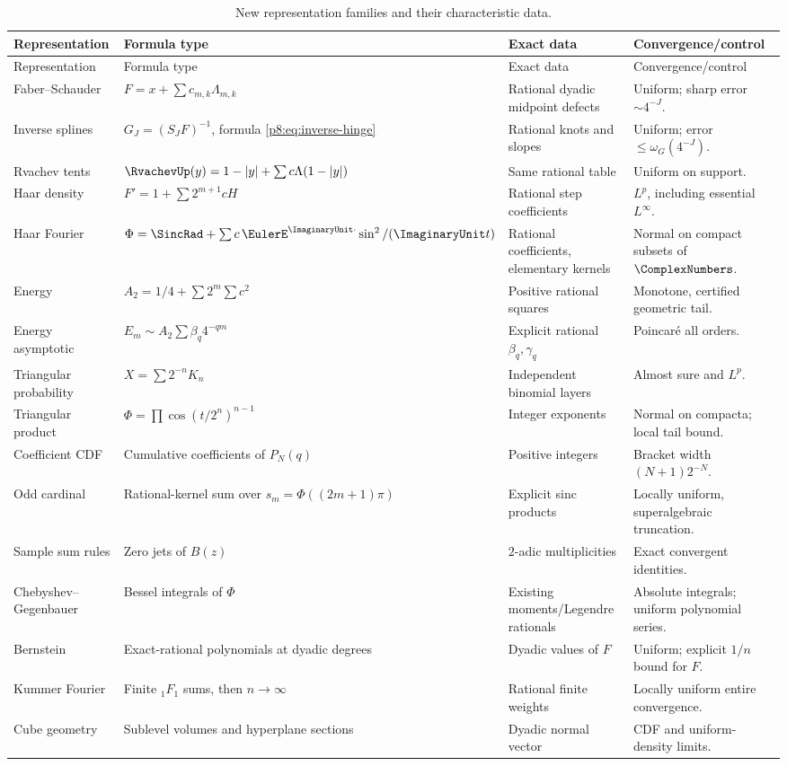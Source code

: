 \documentclass[11pt]{article}
\theoremstyle{definition}
\theoremstyle{remark}
\begin{document}
\begingroup\small
\begin{longtable}{@{}>{\raggedright\arraybackslash}p{}>{\raggedright\arraybackslash}p{}>{\raggedright\arraybackslash}p{}>{\raggedright\arraybackslash}p{}@{}}
\caption{New representation families and their characteristic data.}\label{p8:tab:new-synthesis}\\
\toprule
Representation & Formula type & Exact data & Convergence/control \\
\midrule
\endfirsthead
\toprule
Representation & Formula type & Exact data & Convergence/control \\
\midrule
\endhead
Faber--Schauder & $F=x+\sum c_{m,k}\Lambda_{m,k}$ & Rational dyadic midpoint defects & Uniform; sharp error $\sim4^{-J}$.\\
Inverse splines & $G_J=(S_JF)^{-1}$, formula \eqref{p8:eq:inverse-hinge} & Rational knots and slopes & Uniform; error $\le\omega_G(4^{-J})$.\\
Rvachev tents & $\RvachevUp(y)=1-|y|+\sum c\Lambda(1-|y|)$ & Same rational table & Uniform on support.\\
Haar density & $F'=1+\sum2^{m+1}cH$ & Rational step coefficients & $L^p$, including essential $L^\infty$.\\
Haar Fourier & $\Phi=\SincRad+\sum c\,\EulerE^{\ImaginaryUnit\cdot}\sin^2/(\ImaginaryUnit t)$ & Rational coefficients, elementary kernels & Normal on compact subsets of $\ComplexNumbers$.\\
Energy & $A_2=1/4+\sum2^m\sum c^2$ & Positive rational squares & Monotone, certified geometric tail.\\
Energy asymptotic & $E_m\sim A_2\sum\beta_q4^{-qm}$ & Explicit rational $\beta_q,\gamma_q$ & Poincaré all orders.\\
Triangular probability & $X=\sum2^{-n}K_n$ & Independent binomial layers & Almost sure and $L^p$.\\
Triangular product & $\Phi=\prod\cos(t/2^n)^{n-1}$ & Integer exponents & Normal on compacta; local tail bound.\\
Coefficient CDF & Cumulative coefficients of $P_N(q)$ & Positive integers & Bracket width $(N+1)2^{-N}$.\\
Odd cardinal & Rational-kernel sum over $s_m=\Phi((2m+1)\pi)$ & Explicit sinc products & Locally uniform, superalgebraic truncation.\\
Sample sum rules & Zero jets of $B(z)$ & $2$-adic multiplicities & Exact convergent identities.\\
Chebyshev--\newline Gegenbauer & Bessel integrals of $\Phi$ & Existing moments/Legendre rationals & Absolute integrals; uniform polynomial series.\\
Bernstein & Exact-rational polynomials at dyadic degrees & Dyadic values of $F$ & Uniform; explicit $1/n$ bound for $F$.\\
Kummer Fourier & Finite ${}_1F_1$ sums, then $n\to\infty$ & Rational finite weights & Locally uniform entire convergence.\\
Cube geometry & Sublevel volumes and hyperplane sections & Dyadic normal vector & CDF and uniform-density limits.\\
\bottomrule
\end{longtable}
\end{document}
